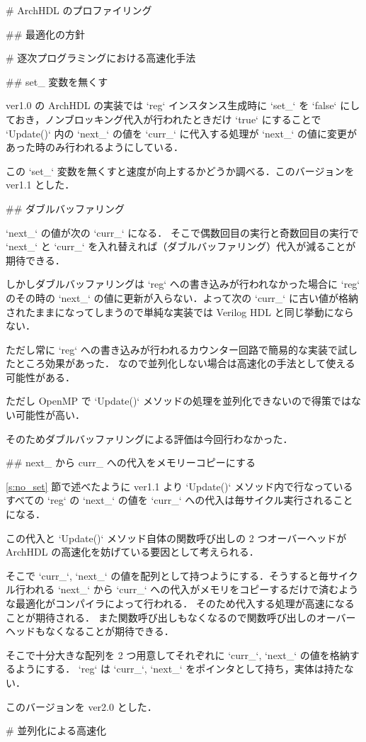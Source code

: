 # ArchHDL のプロファイリング





## 最適化の方針







# 逐次プログラミングにおける高速化手法




## set_ 変数を無くす \label{s:no_set}

ver1.0 の ArchHDL の実装では `reg` インスタンス生成時に `set_` を `false`
にしておき，ノンブロッキング代入が行われたときだけ `true` にすることで
`Update()` 内の `next_` の値を `curr_`
に代入する処理が `next_` の値に変更があった時のみ行われるようにしている．

この `set_` 変数を無くすと速度が向上するかどうか調べる．このバージョンを
ver1.1 とした．




## ダブルバッファリング

`next_` の値が次の `curr_` になる．
そこで偶数回目の実行と奇数回目の実行で `next_` と `curr_`
を入れ替えれば（ダブルバッファリング）代入が減ることが期待できる．

しかしダブルバッファリングは `reg` への書き込みが行われなかった場合に
`reg` のその時の `next_` の値に更新が入らない．よって次の
`curr_` に古い値が格納されたままになってしまうので単純な実装では Verilog HDL と同じ挙動にならない．

ただし常に `reg` への書き込みが行われるカウンター回路で簡易的な実装で試したところ効果があった．
なので並列化しない場合は高速化の手法として使える可能性がある．

ただし OpenMP で `Update()` メソッドの処理を並列化できないので得策ではない可能性が高い．

そのためダブルバッファリングによる評価は今回行わなかった．


## next_ から curr_ への代入をメモリーコピーにする

\ref{s:no_set} 節で述べたように ver1.1 より
`Update()` メソッド内で行なっているすべての `reg` の `next_`
の値を `curr_` への代入は毎サイクル実行されることになる．

この代入と `Update()` メソッド自体の関数呼び出しの
2 つオーバーヘッドが ArchHDL の高速化を妨げている要因として考えられる．

そこで `curr_`, `next_`
の値を配列として持つようにする．そうすると毎サイクル行われる `next_` から `curr_`
への代入がメモリをコピーするだけで済むような最適化がコンパイラによって行われる．
そのため代入する処理が高速になることが期待される．
また関数呼び出しもなくなるので関数呼び出しのオーバーヘッドもなくなることが期待できる．

そこで十分大きな配列を 2 つ用意してそれぞれに `curr_`, `next_` の値を格納するようにする．
`reg` は `curr_`, `next_` をポインタとして持ち，実体は持たない．

このバージョンを ver2.0 とした．




# 並列化による高速化








